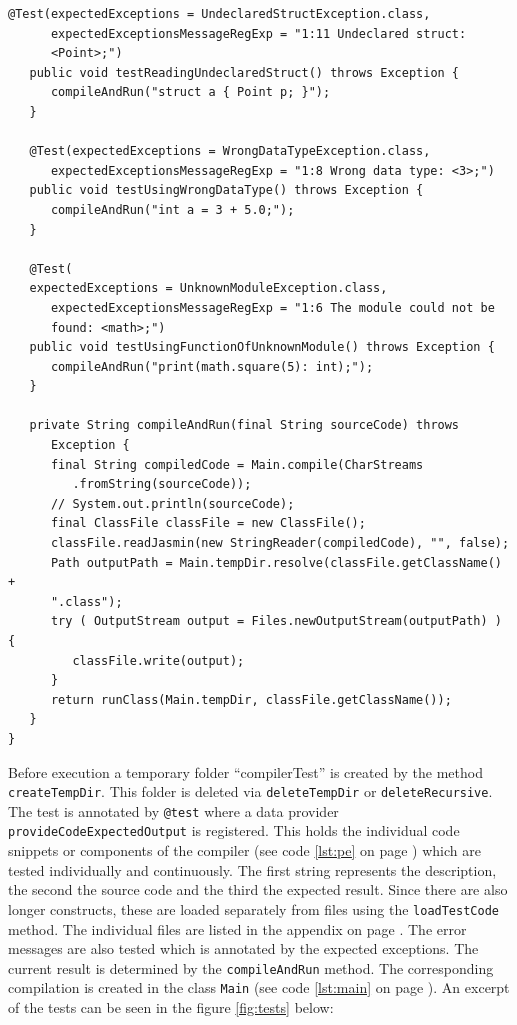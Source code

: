 \begin{lstlisting}[frame=htrbl, caption={Implementation of {\ttfamily CompilerTest.java}}, label={lst:compiler_test}, basicstyle=\footnotesize]
   @Test(expectedExceptions = UndeclaredStructException.class,
      expectedExceptionsMessageRegExp = "1:11 Undeclared struct: 
      <Point>;")
   public void testReadingUndeclaredStruct() throws Exception {
      compileAndRun("struct a { Point p; }");
   }
   
   @Test(expectedExceptions = WrongDataTypeException.class,
      expectedExceptionsMessageRegExp = "1:8 Wrong data type: <3>;")
   public void testUsingWrongDataType() throws Exception {
      compileAndRun("int a = 3 + 5.0;");
   }
   
   @Test(
   expectedExceptions = UnknownModuleException.class,
      expectedExceptionsMessageRegExp = "1:6 The module could not be 
      found: <math>;")
   public void testUsingFunctionOfUnknownModule() throws Exception {
      compileAndRun("print(math.square(5): int);");
   }

   private String compileAndRun(final String sourceCode) throws 
      Exception {
      final String compiledCode = Main.compile(CharStreams
         .fromString(sourceCode));
      // System.out.println(sourceCode);
      final ClassFile classFile = new ClassFile();
      classFile.readJasmin(new StringReader(compiledCode), "", false);
      Path outputPath = Main.tempDir.resolve(classFile.getClassName() +
      ".class");
      try ( OutputStream output = Files.newOutputStream(outputPath) ) {
         classFile.write(output);
      }
      return runClass(Main.tempDir, classFile.getClassName());
   }
}
\end{lstlisting}

Before execution a temporary folder ``compilerTest'' is created by the method \\\texttt{createTempDir}. This folder is deleted via \texttt{deleteTempDir} or \texttt{deleteRecursive}. The test is annotated by \texttt{@test} where a data provider \texttt{provideCodeExpectedOutput} is registered. This holds the individual code snippets or components of the compiler (see code \ref{lst:pe} on page \pageref{lst:pe}) which are tested individually and continuously. The first string represents the description, the second the source code and the third the expected result. Since there are also longer constructs, these are loaded separately from files using the \texttt{loadTestCode} method. The individual files are listed in the appendix on page \pageref{sec:testfiles}. The error messages are also tested which is annotated by the expected exceptions. The current result is determined by the \texttt{compileAndRun} method. The corresponding compilation is created in the class \texttt{Main} (see code \ref{lst:main} on page \pageref{lst:main}). An excerpt of the tests can be seen in the figure \ref{fig:tests} below:

